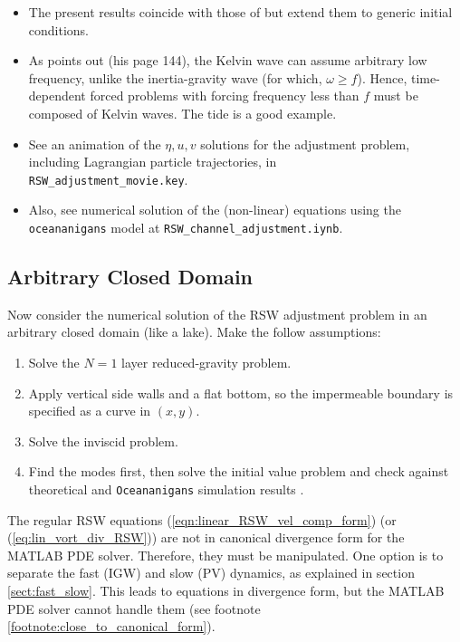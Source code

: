 \documentclass[10pt,reqno]{amsart}
\begin{document}
\begin{itemize}
\item The present results coincide with those of \citet{gill76} but extend them to generic initial conditions.
\item As \citet{pedlosky13} points out (his page 144), the Kelvin wave can assume arbitrary low frequency, unlike the inertia-gravity wave (for which, $\omega \ge f$). Hence, time-dependent forced problems with forcing frequency less than $f$ must be composed of Kelvin waves. The tide is a good example.
\item See an animation of the $\eta, u, v$ solutions for the \citet{gill76} adjustment problem, including Lagrangian particle trajectories, in\\ \texttt{RSW\_adjustment\_movie.key}.
\item Also, see numerical solution of the (non-linear) equations using the \texttt{oceananigans} model at \texttt{RSW\_channel\_adjustment.iynb}.

\end{itemize}

\subsection{Arbitrary Closed Domain}
\label{sect:closed_domain}
Now consider the numerical solution of the RSW adjustment problem in an arbitrary closed domain (like a lake).
Make the follow assumptions:
\begin{enumerate}
\item Solve the $N=1$ layer reduced-gravity problem.
\item Apply vertical side walls and a flat bottom, so the impermeable boundary is specified as a curve in $(x,y)$. 
\item Solve the inviscid problem.
\item Find the modes first, then solve the initial value problem and check against theoretical and \texttt{Oceananigans} simulation results . 
\end{enumerate}

The regular RSW equations (\ref{eqn:linear_RSW_vel_comp_form}) (or (\ref{eq:lin_vort_div_RSW})) are not in canonical divergence form for the MATLAB PDE solver.
Therefore, they must be manipulated.
One option is to separate the fast (IGW) and slow (PV) dynamics, as explained in section \ref{sect:fast_slow}.
This leads to equations in divergence form, but the MATLAB PDE solver cannot handle them (see footnote \ref{footnote:close_to_canonical_form}).
\end{document}
